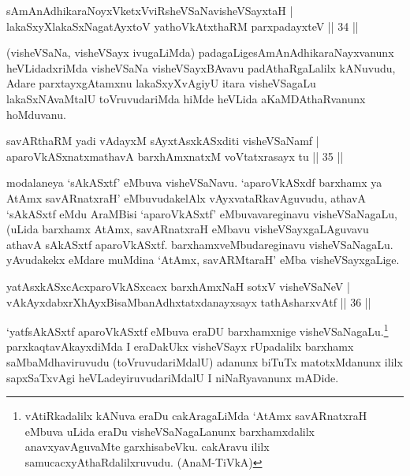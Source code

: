 
\begin{shl}
sAmAnAdhikaraNoyxVketxVviRsheVSaNavisheVSayxtaH |\\
lakaSxyXlakaSxNagatAyx\s toV yathoVkAtxthaRM parxpadayxteV \hfill || 34 ||
\end{shl}

\begin{artha}
(visheVSaNa, visheVSayx ivugaLiMda) padagaLige\footnotemark[1]sAmAnAdhikaraNayxvanunx heVLidadxriMda visheVSaNa visheVSayxBAvavu padAthaRgaLalilx kANuvudu, Adare parxtayxgAtamxnu lakaSxyXvAgiyU itara visheVSagaLu lakaSxNAvaMtalU toVruvudariMda hiMde heVLida aKaMDAthaRvanunx hoMduvanu.
\end{artha}


\begin{shl}
savARthaRM yadi vA\s \s dayxM sAyxtAsxkASxditi visheVSaNamf |\\
aparoVkASxnatxmathavA barxhAmxnatxM voVtatxrasayx tu \hfill || 35 ||
\end{shl}

\begin{artha}
modalaneya `sAkASxtf' eMbuva visheVSaNavu. `aparoVkASxdf barxhamx ya AtAmx savARnatxraH' eMbuvudakelAlx vAyxvataRkavAguvudu, athavA `sAkASxtf eMdu AraMBisi `aparoVkASxtf' eMbuvavareginavu visheVSaNagaLu, (uLida barxhamx AtAmx, savARnatxraH eMbavu visheVSayxgaLAguvavu athavA sAkASxtf aparoVkASxtf. barxhamxveMbudareginavu visheVSaNagaLu. yAvudakekx eMdare muMdina `AtAmx, savARMtaraH' eMba visheVSayxgaLige.
\end{artha}


\begin{shl}
yatAsxkASxcAcxparoVkASxcacx barxhAmxNaH sotxV visheVSaNeV |\\
vAkAyxdabxrXhAyxBisaMbanAdhxtatxdanayxsayx tathA\s sharxvAtf \hfill || 36 ||
\end{shl}

\begin{artha}
`yatfsAkASxtf aparoVkASxtf eMbuva eraDU barxhamxnige visheVSaNagaLu.\footnote[1]{vAtiRkadalilx kANuva eraDu cakAragaLiMda `AtAmx savARnatxraH eMbuva uLida eraDu visheVSaNagaLanunx barxhamxdalilx anavxyavAguvaMte garxhisabeVku. cakAravu ililx samucacxyAthaRdalilxruvudu. (AnaM-TiVkA)} parxkaqtavAkayxdiMda I eraDakUkx visheVSayx rUpadalilx barxhamx saMbaMdhaviruvudu (toVruvudariMdalU) adanunx biTuTx matotxMdanunx ililx sapxSaTxvAgi heVLadeyiruvudariMdalU I niNaRyavanunx mADide.
\end{artha}

